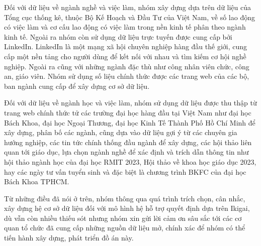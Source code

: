 Đối với dữ liệu về ngành nghề và việc làm, nhóm xây dựng dựa trên dữ liệu của Tổng cục thống kê, thuộc Bộ Kế Hoạch và Đầu Tư của Việt Nam, về số lao động có việc làm và cơ cấu lao động có việc làm trong nền kinh tế phân theo ngành kinh tế. Ngoài ra nhóm còn sử dụng dữ liệu trực tuyến được cung cấp bởi LinkedIn. LinkedIn là một mạng xã hội chuyên nghiệp hàng đầu thế giới, cung cấp một nền tảng cho người dùng để kết nối với nhau và tìm kiếm cơ hội nghề nghiệp. Ngoài ra cũng với những ngành đặc thù như công nhân viên chức, công an, giáo viên. Nhóm sử dụng số liệu chính thức được các trang web của các bộ, ban ngành cung cấp để xây dựng cơ sở dữ liệu.\cite{xaydungdang} \cite{vietnamnet} \cite{cafef}

Đối với dữ liệu về ngành học và việc làm, nhóm sử dụng dữ liệu được thu thập từ trang web chính thức tử các trường đại học hàng đầu tại Việt Nam như đại học Bách Khoa, đại học Ngoại Thương, đại học Kinh Tế Thành Phố Hồ Chí Minh để xây dựng, phân bố các ngành, cũng dựa vào dữ liệu gợi ý từ các chuyên gia hướng nghiệp, các tin tức chính thống đầu ngành để xây dựng, các hội thảo liên quan tới giáo dục, lựa chọn ngành nghề để xác định và trích dẫn thông tin như hội thảo ngành học của đại học RMIT 2023, Hội thảo về khoa học giáo dục 2023, hay các ngày tư vấn tuyển sinh và đặc biệt là chương trình BKFC của đại học Bách Khoa TPHCM.

Từ những điều đã nói ở trên, nhóm thông qua quá trình trích chọn, cân nhắc, xây dựng hệ cơ sở dữ liệu đối với mô hình hệ hỗ trợ quyết định dựa trên Ikigai, dù vẫn còn nhiều thiếu sót nhưng nhóm xin gửi lời cảm ơn sâu sắc tới các cơ quan tổ chức đã cung cấp những nguồn dữ liệu mở, chính xác để nhóm có thể tiến hành xây dựng, phát triển đồ án này.